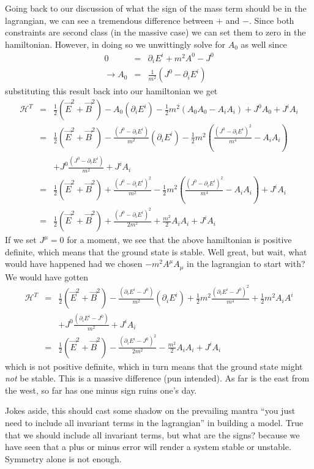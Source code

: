 \documentclass[aps,preprint,preprintnumbers,nofootinbib,showpacs,prd]{revtex4-1}
\newcommand{\nbea}{\begin{eqnarray*}}
\newcommand{\neea}{\end{eqnarray*}}
\begin{document}
Going back to our discussion of what the sign of the mass term should be in the lagrangian, we can see a tremendous difference between $+$ and $-$. Since both constraints are second class (in the massive case) we can set them to zero in the hamiltonian. However, in doing so we unwittingly solve for $A_0$ as well since
%
\nbea
0 & = & \partial_i E^{i} + m^2 A^0 - J^0 \\
\to A_0 & = & \frac{1}{m^2} (J^0 - \partial_i E^{i})
\neea
%
substituting this result back into our hamiltonian we get
%
\nbea
\mathcal{H}^T & = & \frac{1}{2} \left ( \vec E^2 + \vec B^2 \right ) - A_0 (\partial_i E^{i}) - \frac{1}{2} m^2 (A_0 A_0 - A_i A_i) + J^0 A_0 + J^i A_i \\
& = & \frac{1}{2} \left ( \vec E^2 + \vec B^2 \right ) - \frac{ (J^0 - \partial_i E^{i})}{m^2} (\partial_i E^{i}) - \frac{1}{2} m^2 \left (\frac{ (J^0 - \partial_i E^{i})^2}{m^4} - A_i A_i \right ) \\
&& + J^0 \frac{ (J^0 - \partial_i E^{i})}{m^2} + J^i A_i \\
& = & \frac{1}{2} \left ( \vec E^2 + \vec B^2 \right ) + \frac{ (J^0 - \partial_i E^{i})^2}{m^2} - \frac{1}{2} m^2 \left (\frac{ (J^0 - \partial_i E^{i})^2}{m^4} - A_i A_i \right ) + J^i A_i \\
& = & \frac{1}{2} \left ( \vec E^2 + \vec B^2 \right ) + \frac{ (J^0 - \partial_i E^{i})^2}{2 m^2} + \frac{m^2}{2} A_i A_i + J^i A_i
\neea
%
If we set $J^\mu = 0$ for a moment, we see that the above hamiltonian is positive definite, which means that the ground state is stable. Well great, but wait, what would have happened had we chosen $-m^2 A^\mu A_\mu$ in the lagrangian to start with? We would have gotten
%
\nbea
\mathcal{H}^T & = & \frac{1}{2} \left ( \vec E^2 + \vec B^2 \right ) - \frac{(\partial_i E^{i} - J^0)}{m^2} (\partial_i E^{i}) +\frac{1}{2} m^2 \frac{(\partial_i E^{i} - J^0)^2}{m^4} + \frac{1}{2} m^2 A_i A^i \\
&& + J^0 \frac{(\partial_i E^{i} - J^0)}{m^2} + J^i A_i \\
& = & \frac{1}{2} \left ( \vec E^2 + \vec B^2 \right ) - \frac{(\partial_i E^{i} - J^0)^2}{2 m^2} - \frac{m^2}{2} A_i A_i + J^i A_i
\neea
%
which is not positive definite, which in turn means that the ground state might {\it not} be stable. This is a massive difference (pun intended). As far is the east from the west, so far has one minus sign ruins one's day.

Jokes aside, this should cast some shadow on the prevailing mantra ``you just need to include all invariant terms in the lagrangian'' in building a model. True that we should include all invariant terms, but what are the signs? because we have seen that a plus or minus error will render a system stable or unstable. Symmetry alone is not enough.
\end{document}
